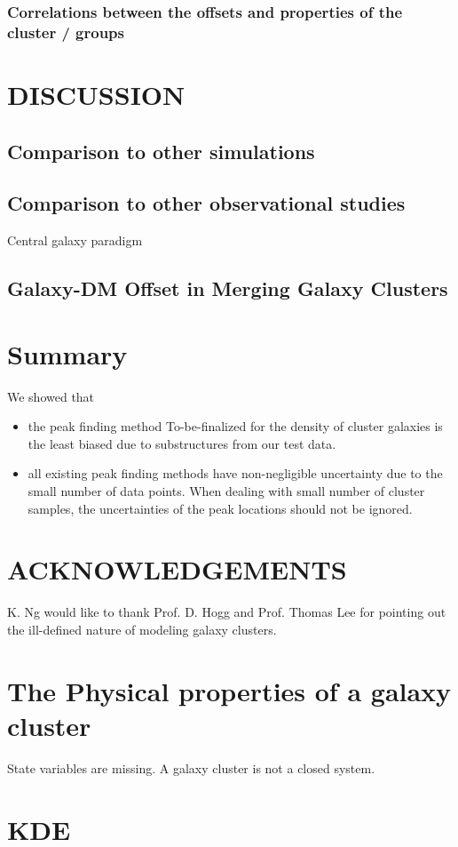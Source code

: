 \documentclass[usenatbib]{mn2e}
\begin{document}
\subsubsection{Correlations between the offsets and properties of the cluster / groups}
\section{DISCUSSION}
\subsection{Comparison to other simulations}
\subsection{Comparison to other observational studies}
Central galaxy paradigm


\subsection{Galaxy-DM Offset in Merging Galaxy Clusters}



\section{Summary}
We showed that 
\begin{itemize}
		\item  the peak finding method To-be-finalized for the density of cluster
			galaxies is the least biased due to substructures from our test data. 
		\item  all existing peak finding methods have non-negligible uncertainty 
			due to the small number of data points. When dealing with small number of
			cluster samples, the uncertainties of the peak locations should not be
			ignored.
\end{itemize}




\section{ACKNOWLEDGEMENTS}
K. Ng would like to thank Prof. D. Hogg and Prof. Thomas Lee for pointing out the ill-defined nature of
modeling galaxy clusters.

\appendix 
\section{The Physical properties of a galaxy cluster}
State variables are missing.
A galaxy cluster is not a closed system. 






\appendix
\section{KDE}
\clearpage\bsp\label{lastpage} 
\end{document}
